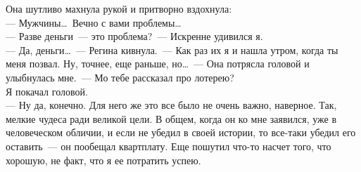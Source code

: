 Она шутливо махнула рукой и притворно вздохнула:\\
--- Мужчины\ldots\ Вечно с вами проблемы\ldots\\
--- Разве деньги~--- это проблема?~--- Искренне удивился я.\\
--- Да, деньги\ldots~--- Регина кивнула.~--- Как раз их я и нашла утром, когда 
ты меня позвал. Ну, точнее, еще раньше, но\ldots~--- Она потрясла головой и улыбнулась 
мне.~--- Мо тебе рассказал про лотерею?\\
Я покачал головой.\\
--- Ну да, конечно. Для него же это все было не очень важно, наверное. Так, 
мелкие чудеса ради великой цели. В общем, когда он ко мне заявился, уже в человеческом 
обличии, и если не убедил в своей истории, то все-таки убедил его оставить~--- 
он пообещал квартплату. Еще пошутил что-то насчет того, что хорошую, не факт, что 
я ее потратить успею.

